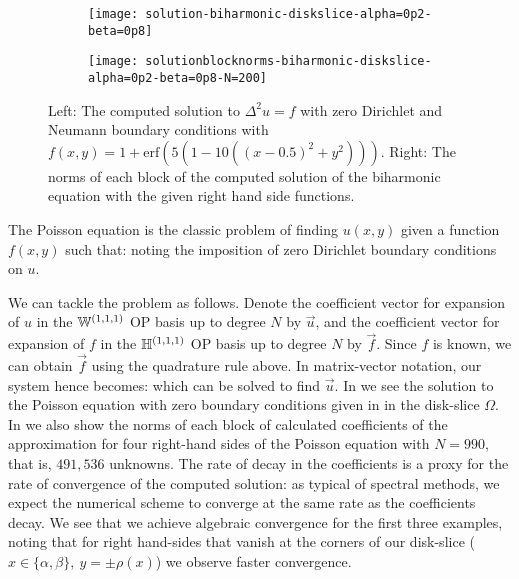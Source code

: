 \begin{figure}[t]
	\begin{subfigure}{0.3\textwidth}
	\centering
	\texttt{[image: solution-biharmonic-diskslice-alpha=0p2-beta=0p8]}
	\end{subfigure}
	\begin{subfigure}{0.5\textwidth}
	\texttt{[image: solutionblocknorms-biharmonic-diskslice-alpha=0p2-beta=0p8-N=200]}
	\centering
	\end{subfigure}
	\caption{Left: The computed solution to $\Delta^2 u = f$ with zero Dirichlet and Neumann boundary conditions with $f(x,y) = 1 + \text{erf}(5(1 - 10((x - 0.5)^2 + y^2)))$. Right: The norms of each block of the computed solution of the biharmonic equation with the given right hand side functions.}
	\centering
	\label{fig:ds:biharmonic}
\end{figure}

The Poisson equation is the classic problem of finding $u(x,y)$ given a function $f(x,y)$ such that:
noting the imposition of zero Dirichlet boundary conditions on $u$.

We can tackle the problem as follows. Denote the coefficient vector for expansion of $u$ in the ${\mathbb{W}^{(1,1,1)}}$ OP basis up to degree $N$ by $\vec{u}$, and the coefficient vector for expansion of $f$ in the ${\mathbb{H}^{(1,1,1)}}$ OP basis up to degree $N$ by $\vec{f}$. Since $f$ is known, we can obtain $\vec{f}$ using the quadrature rule above. In matrix-vector notation, our system hence becomes:
which can be solved to find $\vec{u}$.
In  we see the solution to the Poisson equation with zero boundary conditions given in  in the disk-slice $\Omega$. In  we also show the norms of each block of calculated coefficients of the approximation for four right-hand sides of the Poisson equation with $N = 990$, that is, $491,536$ unknowns. The rate of decay in the coefficients is a proxy for the rate of convergence of the computed solution: as typical of spectral methods, we expect the numerical scheme to converge at the same rate as the coefficients decay. We see that we achieve algebraic convergence for the first three examples, noting that for right hand-sides that vanish at the corners of our disk-slice ($x\in\{\alpha,\beta\}, \: y = \pm \rho(x)$) we observe faster convergence. 


